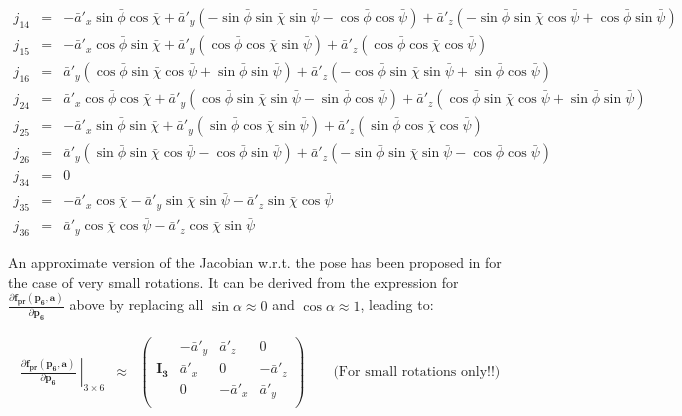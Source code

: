 \documentclass[a4paper,11pt]{report}
\begin{document}
\begin{eqnarray*}
j_{14} &=& 
-\bar a'_x \sin \bar\phi \cos \bar\chi+\bar a'_y (-\sin \bar\phi \sin \bar\chi \sin \bar\psi-\cos \bar\phi \cos \bar\psi)+\bar a'_z (-\sin \bar\phi \sin \bar\chi \cos
\bar\psi+\cos
\bar\phi \sin \bar\psi) 
\\
j_{15} &=&     
-\bar a'_x \cos \bar\phi \sin \bar\chi+\bar a'_y (\cos \bar\phi \cos \bar\chi \sin \bar\psi       )+\bar a'_z (\cos \bar\phi \cos \bar\chi \cos \bar\psi      ) 
\\
j_{16} &=& 
\bar a'_y (\cos \bar\phi \sin \bar\chi \cos \bar\psi+\sin \bar\phi \sin \bar\psi)+\bar a'_z (-\cos \bar\phi \sin \bar\chi \sin \bar\psi+\sin \bar\phi \cos \bar\psi) 
\\
j_{24} &=& 
\bar a'_x \cos \bar\phi \cos \bar\chi+\bar a'_y (\cos \bar\phi \sin \bar\chi \sin \bar\psi-\sin \bar\phi \cos \bar\psi)+\bar a'_z (\cos \bar\phi \sin \bar\chi \cos
\bar\psi+\sin
\bar\phi \sin \bar\psi) 
\\
j_{25} &=& 
-\bar a'_x \sin \bar\phi \sin \bar\chi+\bar a'_y (\sin \bar\phi \cos \bar\chi \sin \bar\psi)      +\bar a'_z (\sin \bar\phi \cos \bar\chi \cos \bar\psi      ) 
\\
j_{26} &=& 
\bar a'_y (\sin \bar\phi \sin \bar\chi \cos \bar\psi-\cos \bar\phi \sin \bar\psi)+\bar a'_z (-\sin \bar\phi \sin \bar\chi \sin \bar\psi-\cos \bar\phi \cos \bar\psi) 
\\
j_{34} &=& 
0
\\
j_{35} &=& 
    -\bar a'_x \cos \bar\chi-\bar a'_y \sin \bar\chi \sin \bar\psi-\bar a'_z \sin \bar\chi \cos \bar\psi 
\\
j_{36} &=& 
\bar a'_y \cos \bar\chi \cos \bar\psi-\bar a'_z \cos \bar\chi \sin \bar\psi
\end{eqnarray*}


An approximate version of the Jacobian w.r.t. the pose has been proposed in 
\cite{sibley2009rba} for the case of very small rotations. 
It can be derived from the expression for 
$\frac{\partial \mathbf{f_{pr}} (\mathbf{p_6},\mathbf{a})}{\partial \mathbf{p_6}}$
above by replacing all $\sin \alpha \approx 0$ and $\cos \alpha \approx 1$, 
leading to:

\begin{eqnarray}
\left. \frac{\partial \mathbf{f_{pr}} (\mathbf{p_6},\mathbf{a})}{\partial \mathbf{p_6}} ~
\right|_{3 \times 6}
&\approx& 
\left(
\begin{array}{c|ccc}
~            & -\bar a'_y & \bar a'_z & 0 \\
\mathbf{I_3} & \bar a'_x & 0 & -\bar a'_z \\
~            & 0 & -\bar a'_x & \bar a'_y \\
\end{array}
\right)
\quad\quad \text{(For small rotations only!!)}
\end{eqnarray}
\end{document}
